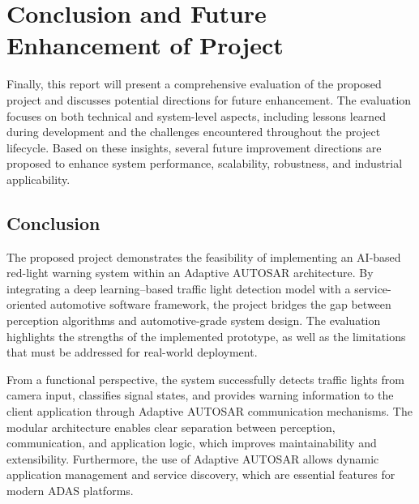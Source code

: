 



\chapter{Conclusion and Future Enhancement of Project}

Finally, this report will present a comprehensive evaluation of the proposed project and discusses potential directions for future enhancement. The evaluation focuses on both technical and system-level aspects, including lessons learned during development and the challenges encountered throughout the project lifecycle. Based on these insights, several future improvement directions are proposed to enhance system performance, scalability, robustness, and industrial applicability.

\section{Conclusion}

The proposed project demonstrates the feasibility of implementing an AI-based red-light warning system within an Adaptive AUTOSAR architecture. By integrating a deep learning–based traffic light detection model with a service-oriented automotive software framework, the project bridges the gap between perception algorithms and automotive-grade system design. The evaluation highlights the strengths of the implemented prototype, as well as the limitations that must be addressed for real-world deployment.

From a functional perspective, the system successfully detects traffic lights from camera input, classifies signal states, and provides warning information to the client application through Adaptive AUTOSAR communication mechanisms. The modular architecture enables clear separation between perception, communication, and application logic, which improves maintainability and extensibility. Furthermore, the use of Adaptive AUTOSAR allows dynamic application management and service discovery, which are essential features for modern ADAS platforms.

